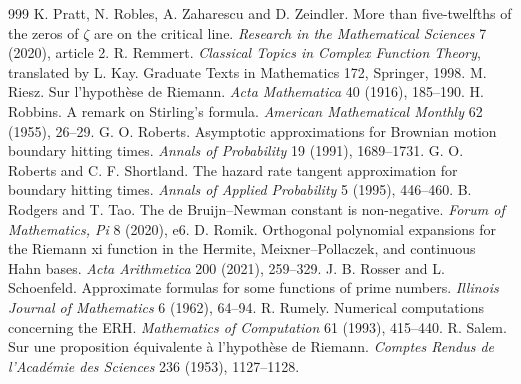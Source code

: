 \begin{thebibliography}{999}
 K. Pratt, N. Robles, A. Zaharescu and D. Zeindler. More than five-twelfths of the zeros of $\zeta$ are on the critical line. \emph{Research in the Mathematical Sciences} 7 (2020), article 2.
 R. Remmert. \emph{Classical Topics in Complex Function Theory}, translated by L. Kay. Graduate Texts in Mathematics 172, Springer, 1998.
 M. Riesz. Sur l'hypoth\`ese de Riemann. \emph{Acta Mathematica} 40 (1916), 185--190.
 H. Robbins. A remark on Stirling's formula. \emph{American Mathematical Monthly} 62 (1955), 26--29.
 G. O. Roberts. Asymptotic approximations for Brownian motion boundary hitting times. \emph{Annals of Probability} 19 (1991), 1689--1731.
 G. O. Roberts and C. F. Shortland. The hazard rate tangent approximation for boundary hitting times. \emph{Annals of Applied Probability} 5 (1995), 446--460.
 B. Rodgers and T. Tao. The de Bruijn--Newman constant is non-negative. \emph{Forum of Mathematics, Pi} 8 (2020), e6.
 D. Romik. Orthogonal polynomial expansions for the Riemann xi function in the Hermite, Meixner--Pollaczek, and continuous Hahn bases. \emph{Acta Arithmetica} 200 (2021), 259--329.
 J. B. Rosser and L. Schoenfeld. Approximate formulas for some functions of prime numbers. \emph{Illinois Journal of Mathematics} 6 (1962), 64--94.
 R. Rumely. Numerical computations concerning the ERH. \emph{Mathematics of Computation} 61 (1993), 415--440.
 R. Salem. Sur une proposition \'equivalente \`a l'hypoth\`ese de Riemann. \emph{Comptes Rendus de l'Acad\'emie des Sciences} 236 (1953), 1127--1128.

\end{thebibliography}
